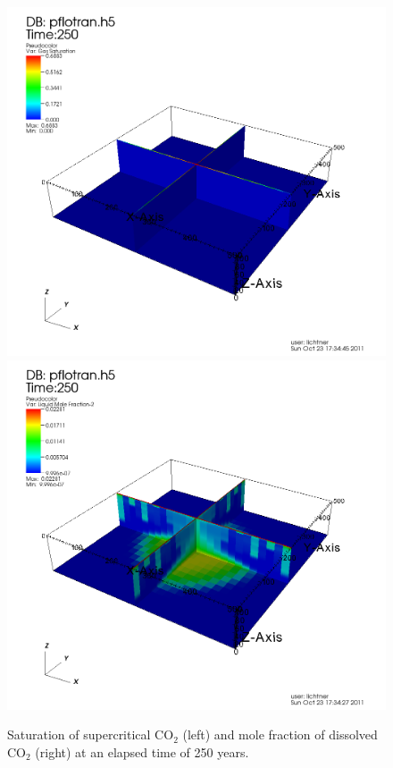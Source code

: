 \documentclass[12pt]{article}
\begin{document}
\begin{figure}
\includegraphics[scale=0.25]{./figs/sg-250y.png}
\includegraphics[scale=0.25]{./figs/xlco2-250y.png}
\caption{Saturation of supercritical CO$_2$ (left) and mole fraction of dissolved CO$_2$ (right) at an elapsed time of 250 years.}\label{f250y}
\end{figure}
\end{document}
